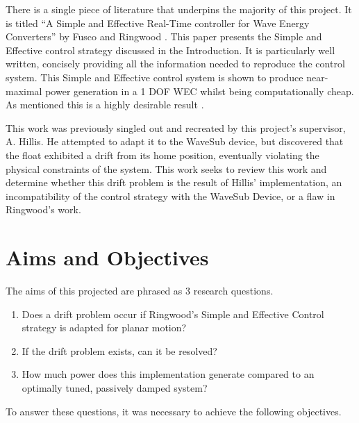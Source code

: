 \documentclass{report}
\begin{document}
There is a single piece of literature that underpins the majority of this project. It is titled ``A Simple and Effective Real-Time controller for Wave Energy Converters'' by Fusco and Ringwood \cite{ringwood}. This paper presents the Simple and Effective control strategy discussed in the Introduction. It is particularly well written, concisely providing all the information needed to reproduce the control system. This Simple and Effective control system is shown to produce near-maximal power generation in a 1 DOF WEC whilst being computationally cheap. As mentioned this is a highly desirable result \cite{carbonTrust}.

This work was previously singled out and recreated by this project's supervisor, A. Hillis. He attempted to adapt it to the WaveSub device, but discovered that the float exhibited a drift from its home position, eventually violating the physical constraints of the system. This work seeks to review this work and determine whether this drift problem is the result of Hillis' implementation, an incompatibility of the control strategy with the WaveSub Device, or a flaw in Ringwood's work.


\chapter{Aims and Objectives}
The aims of this projected are phrased as 3 research questions.
\begin{enumerate}
\item{Does a drift problem occur if Ringwood's Simple and Effective Control strategy is adapted for planar motion?}
\item{If the drift problem exists, can it be resolved?}
\item{How much power does this implementation generate compared to an optimally tuned, passively damped system?}
\end{enumerate}

To answer these questions, it was necessary to achieve the following objectives.
\end{document}
